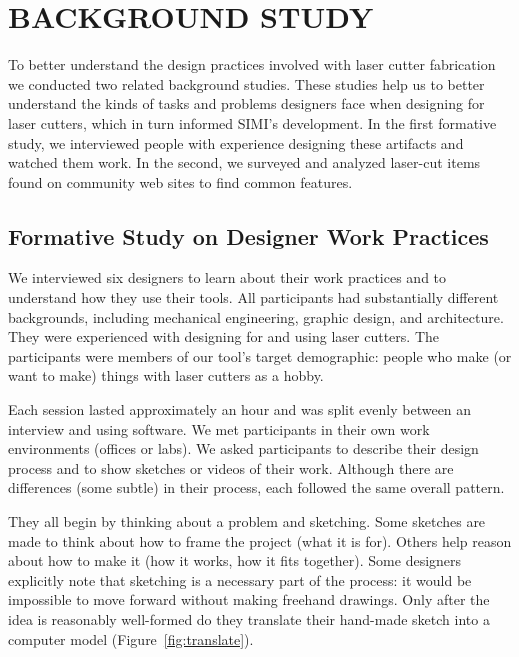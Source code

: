 \documentclass{article}
\begin{document}
\section{BACKGROUND STUDY}

To better understand the design practices involved with laser cutter
fabrication we conducted two related background studies. These studies
help us to better understand the kinds of tasks and problems designers
face when designing for laser cutters, which in turn informed SIMI's
development.  In the first formative study, we interviewed people with
experience designing these artifacts and watched them work. In the
second, we surveyed and analyzed laser-cut items found on community
web sites to find common features.

\subsection{Formative Study on Designer Work Practices}
\label{sec:formative}

We interviewed six designers to learn about their work practices and
to understand how they use their tools. All participants had
substantially different backgrounds, including mechanical engineering,
graphic design, and architecture. They were experienced with designing
for and using laser cutters. The participants were members of our
tool's target demographic: people who make (or want to make) things
with laser cutters as a hobby.

Each session lasted approximately an hour and was split evenly between
an interview and using software. We met participants in their own work
environments (offices or labs). We asked participants to describe
their design process and to show sketches or videos of their
work. Although there are differences (some subtle) in their process,
each followed the same overall pattern.

They all begin by thinking about a problem and sketching. Some
sketches are made to think about how to frame the project (what it is
for). Others help reason about how to make it (how it works, how it
fits together). Some designers explicitly note that sketching is a
necessary part of the process: it would be impossible to move forward
without making freehand drawings. Only after the idea is reasonably
well-formed do they translate their hand-made sketch into a computer
model (Figure~\ref{fig:translate}).
\end{document}

